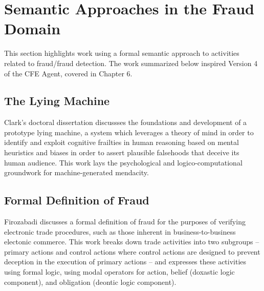 \section{Semantic Approaches in the Fraud Domain}

This section highlights work using a formal semantic approach to activities related to fraud/fraud detection.  The work summarized below inspired Version 4 of the CFE Agent, covered in Chapter 6.

\subsection{The Lying Machine}

Clark's doctoral dissertation \cite{Clark:2010:CIL:2019791} discussses the foundations and development of a prototype lying machine, a system which leverages a theory of mind in order to identify and exploit cognitive frailties in human reasoning based on mental heuristics and biases in order to assert plausible falsehoods that deceive its human audience.  This work lays the psychological and logico-computational groundwork for machine-generated mendacity.

\subsection{Formal Definition of Fraud}

Firozabadi \cite{firozabadi1998formal} discusses a formal definition of fraud for the purposes of verifying electronic trade procedures, such as those inherent in business-to-business electonic commerce.  This work breaks down trade activities into two subgroups -- primary actions and control actions where control actions are designed to prevent deception in the execution of primary actions -- and expresses these activities using formal logic, using modal operators for action, belief (doxastic logic component), and obligation (deontic logic component).










